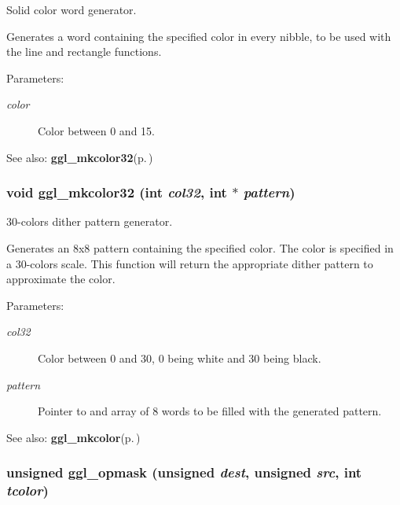 Solid color word generator. 

Generates a word containing the specified color in every nibble, to be used with the line and rectangle functions.

\begin{Desc}
\item[Parameters:]
\begin{description}
\item[{\em color}]Color between 0 and 15. \end{description}
\end{Desc}
\begin{Desc}
\item[See also:]{\bf ggl\_\-mkcolor32}{\rm (p.\,\pageref{ggl_8h_a33})} \end{Desc}
\subsubsection{\setlength{\rightskip}{0pt plus 5cm}void ggl\_\-mkcolor32 (int {\em col32}, int $\ast$ {\em pattern})}\label{ggl_8h_a33}


30-colors dither pattern generator. 

Generates an 8x8 pattern containing the specified color. The color is specified in a 30-colors scale. This function will return the appropriate dither pattern to approximate the color.

\begin{Desc}
\item[Parameters:]
\begin{description}
\item[{\em col32}]Color between 0 and 30, 0 being white and 30 being black. \item[{\em pattern}]Pointer to and array of 8 words to be filled with the generated pattern.\end{description}
\end{Desc}
\begin{Desc}
\item[See also:]{\bf ggl\_\-mkcolor}{\rm (p.\,\pageref{ggl_8h_a32})} \end{Desc}
\subsubsection{\setlength{\rightskip}{0pt plus 5cm}unsigned ggl\_\-opmask (unsigned {\em dest}, unsigned {\em src}, int {\em tcolor})}\label{ggl_8h_a30}



